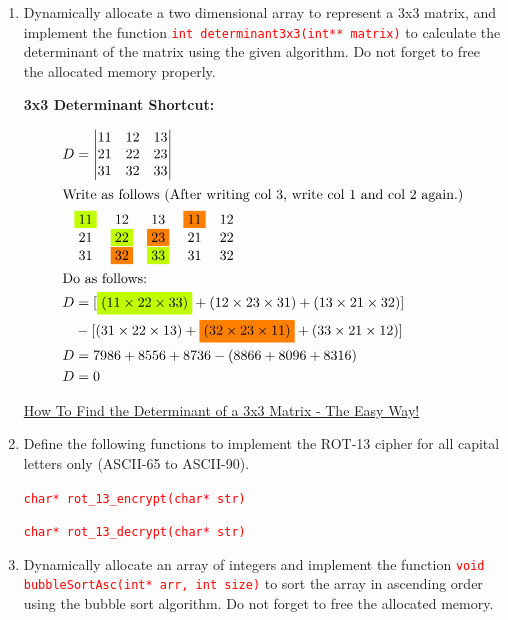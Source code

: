 \documentclass[12pt]{article}
\begin{document}
\begin{enumerate}
    \item Dynamically allocate a two dimensional array to represent a 3x3 matrix, and implement the function 
    \textcolor{red}{\texttt{int determinant3x3(int** matrix)}} to calculate the determinant of the matrix using 
    the given algorithm. Do not forget to free the allocated memory properly.

    \textbf{3x3 Determinant Shortcut:}

\begin{align*}
    D &= 
    \begin{vmatrix}
    11 & 12 & 13 \\
    21 & 22 & 23 \\
    31 & 32 & 33 \\
    \end{vmatrix} \\
    \intertext{Write as follows (After writing col 3, write col 1 and col 2 again.)}
    &\begin{matrix}
    \colorbox{lime}{11} & 12 & 13 & \colorbox{orange}{11} & 12 \\
    21 & \colorbox{lime}{22} & \colorbox{orange}{23} & 21 & 22 \\
    31 & \colorbox{orange}{32} & \colorbox{lime}{33} & 31 & 32 \\
    \end{matrix} \\
    \intertext{Do as follows:}
    D &= [\colorbox{lime}{$(11 \times 22 \times 33)$} + (12 \times 23 \times 31) + (13 \times 21 \times 32) ] \\&- [(31 \times 22 \times 13) + \colorbox{orange}{$(32 \times 23 \times 11)$} + (33 \times 21 \times 12) ]\\
    D &= 7986 + 8556 + 8736 - (8866 + 8096 + 8316) \\
    D &= 0  \\
\end{align*}

    \begin{center}
        \href{https://www.youtube.com/watch?v=z5Yf7QwrotE}{How To Find the Determinant of a 3x3 Matrix - The Easy Way!}
    \end{center}

    \item Define the following functions to implement the ROT-13 cipher for all capital letters 
    only (ASCII-65 to ASCII-90).
    
    \textcolor{red}{\texttt{char* rot\_13\_encrypt(char* str)}}  
    
    \textcolor{red}{\texttt{char* rot\_13\_decrypt(char* str)}}


    \item Dynamically allocate an array of integers and implement the function 
    \textcolor{red}{\texttt{void bubbleSortAsc(int* arr, int size)}} to sort the array in ascending order 
    using the bubble sort algorithm. Do not forget to free the allocated memory.


\end{enumerate}
\end{document}
